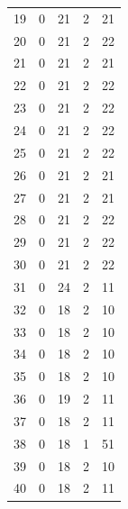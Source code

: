 \documentclass[12pt,a4paper]{report}
\begin{document}
\begin{appendices}
\begin{longtable}{lcccc}
19  &   0 &  21 &   2 &  21 \\
20  &   0 &  21 &   2 &  22 \\
21  &   0 &  21 &   2 &  21 \\
22  &   0 &  21 &   2 &  22 \\
23  &   0 &  21 &   2 &  22 \\
24  &   0 &  21 &   2 &  22 \\
25  &   0 &  21 &   2 &  22 \\
26  &   0 &  21 &   2 &  21 \\
27  &   0 &  21 &   2 &  21 \\
28  &   0 &  21 &   2 &  22 \\
29  &   0 &  21 &   2 &  22 \\
30  &   0 &  21 &   2 &  22 \\
31  &   0 &  24 &   2 &  11 \\
32  &   0 &  18 &   2 &  10 \\
33  &   0 &  18 &   2 &  10 \\
34  &   0 &  18 &   2 &  10 \\
35  &   0 &  18 &   2 &  10 \\
36  &   0 &  19 &   2 &  11 \\
37  &   0 &  18 &   2 &  11 \\
38  &   0 &  18 &   1 &  51 \\
39  &   0 &  18 &   2 &  10 \\
40  &   0 &  18 &   2 &  11 \\
\bottomrule
\end{longtable}


\end{appendices}
\end{document}
